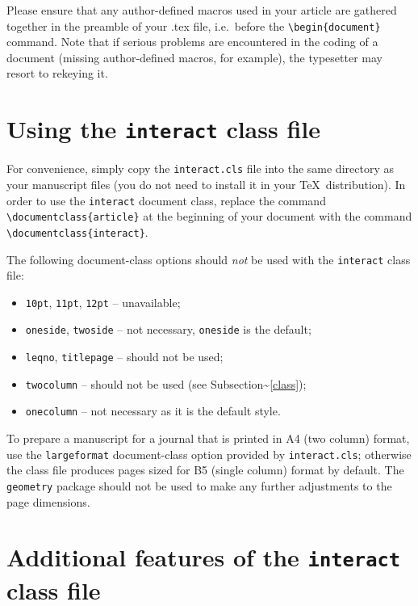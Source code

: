 \documentclass[]{interact}
\theoremstyle{plain}%
\theoremstyle{definition}
\theoremstyle{remark}
\providecommand{\tightlist}{%
  \setlength{\itemsep}{0pt}\setlength{\parskip}{0pt}}
\def\tightlist{}
\begin{document}
Please ensure that any author-defined macros used in your article are
gathered together in the preamble of your .tex file, i.e.~before the
\texttt{\textbackslash{}begin\{document\}} command. Note that if serious
problems are encountered in the coding of a document (missing
author-defined macros, for example), the typesetter may resort to
rekeying it.

\hypertarget{using-the-interact-class-file}{%
\section{\texorpdfstring{Using the \texttt{interact} class
file}{Using the interact class file}}\label{using-the-interact-class-file}}

For convenience, simply copy the \texttt{interact.cls} file into the
same directory as your manuscript files (you do not need to install it
in your \TeX~distribution). In order to use the \texttt{interact}
document class, replace the command
\texttt{\textbackslash{}documentclass\{article\}} at the beginning of
your document with the command
\texttt{\textbackslash{}documentclass\{interact\}}.

The following document-class options should \emph{not} be used with the
\texttt{interact} class file:

\begin{itemize}
\tightlist
\item
  \texttt{10pt}, \texttt{11pt}, \texttt{12pt} -- unavailable;
\item
  \texttt{oneside}, \texttt{twoside} -- not necessary, \texttt{oneside}
  is the default;
\item
  \texttt{leqno}, \texttt{titlepage} -- should not be used;
\item
  \texttt{twocolumn} -- should not be used (see
  Subsection\textasciitilde{}\ref{class});
\item
  \texttt{onecolumn} -- not necessary as it is the default style.
\end{itemize}

To prepare a manuscript for a journal that is printed in A4 (two column)
format, use the \texttt{largeformat} document-class option provided by
\texttt{interact.cls}; otherwise the class file produces pages sized for
B5 (single column) format by default. The \texttt{geometry} package
should not be used to make any further adjustments to the page
dimensions.

\hypertarget{additional-features-of-the-interact-class-file}{%
\section{\texorpdfstring{Additional features of the \texttt{interact}
class
file}{Additional features of the interact class file}}\label{additional-features-of-the-interact-class-file}}
\end{document}
